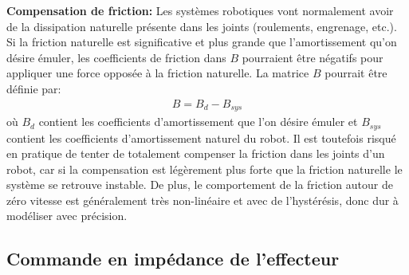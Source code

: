 \textbf{Compensation de friction: } Les systèmes robotiques vont normalement avoir de la dissipation naturelle présente dans les joints (roulements, engrenage, etc.). Si la friction naturelle est significative et plus grande que l'amortissement qu'on désire émuler, les coefficients de friction dans $B$ pourraient être négatifs pour appliquer une force opposée à la friction naturelle. La matrice $B$ pourrait être définie par:
\begin{align}
	B = B_{d} - B_{sys}
\end{align}
où $B_{d}$ contient les coefficients d'amortissement que l'on désire émuler et $B_{sys}$ contient les coefficients d'amortissement naturel du robot. Il est toutefois risqué en pratique de tenter de totalement compenser la friction dans les joints d'un robot, car si la compensation est légèrement plus forte que la friction naturelle le système se retrouve instable. De plus, le comportement de la friction autour de zéro vitesse est généralement très non-linéaire et avec de l'hystérésis, donc dur à modéliser avec précision.



\subsection{Commande en impédance de l'effecteur}
\label{sec:effimpcontrol}

